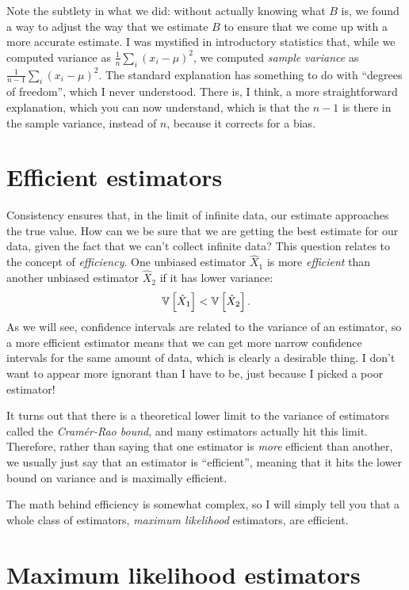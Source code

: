 Note the subtlety in what we did: without actually knowing what $B$ is, we found
a way to adjust the way that we estimate $B$ to ensure that we come up with a more
accurate estimate. I was mystified in introductory statistics that, while we computed
variance as $\tfrac{1}{n} \sum_i (x_i - \mu)^2$, we computed \emph{sample variance}
as $\tfrac{1}{n-1} \sum_i (x_i - \mu)^2$. The standard explanation has something to
do with ``degrees of freedom'', which I never understood. There is, I think, a
more straightforward explanation, which you can now understand, which is that the
$n-1$ is there in the sample variance, instead of $n$, because it corrects for a
bias.

\section{Efficient estimators}

Consistency ensures that, in the limit of infinite data, our estimate approaches
the true value. How can we be sure that we are getting the best estimate for our
data, given the fact that we can't collect infinite data? This question relates
to the concept of \emph{efficiency}. One unbiased estimator $\hat{X}_1$ is 
more \emph{efficient} than another
unbiased estimator $\hat{X}_2$ if it has lower variance:
\begin{equation*}
    \mathbb{V}\left[{\hat{X}_1}\right] < \mathbb{V}\left[{\hat{X}_2}\right].
\end{equation*}
As we will see, confidence intervals are related to the variance of an estimator,
so a more efficient estimator means that we can get more narrow confidence intervals
for the same amount of data, which is clearly a desirable thing. I don't want to
appear more ignorant than I have to be, just because I picked a poor estimator!

It turns out that there is a theoretical lower limit to the variance of estimators
called the \emph{Cram\'{e}r-Rao bound}, and many estimators actually hit this limit.
Therefore, rather than saying that one estimator is \emph{more} efficient than
another, we usually just say that an estimator is ``efficient'', meaning that it
hits the lower bound on variance and is maximally efficient.

The math behind efficiency is somewhat complex, so I will simply tell you that
a whole class of estimators, \emph{maximum likelihood} estimators, are efficient.

\section{Maximum likelihood estimators}

